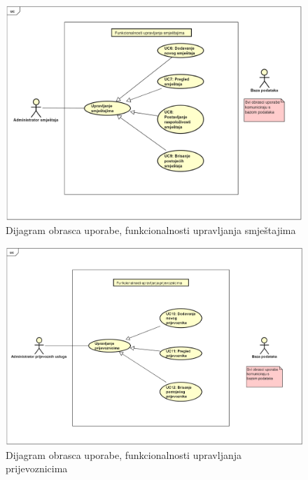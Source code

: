 					\begin{figure}[H]
					\centering
					\includegraphics[width=\textwidth]{slike/DOU_FunkcionalnostiUpravljanjaSmjestajima.png} %
					\caption{Dijagram obrasca uporabe, funkcionalnosti upravljanja smještajima}
					\label{fig:funkcionalnosti upravljanja smještajima}
				\end{figure}
				\eject		
				
				\begin{figure}[H]
					\centering
					\includegraphics[width=\textwidth]{slike/DOU_FunkcionalnostiUpravljanjaPrijevoznicima.png} %
					\caption{Dijagram obrasca uporabe, funkcionalnosti upravljanja prijevoznicima}
					\label{fig:funkcionalnosti upravljanja prijevoznicima}
				\end{figure}
				\eject		
				
